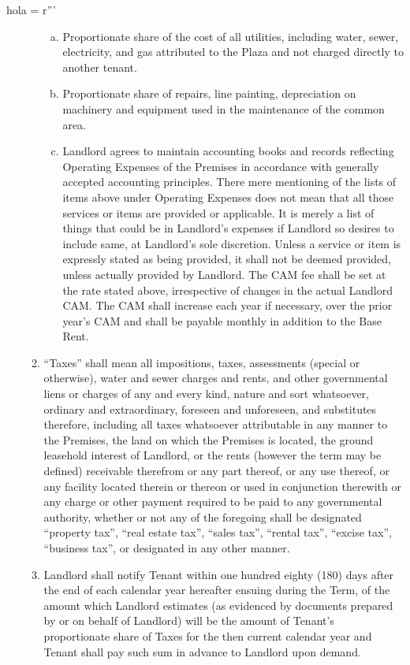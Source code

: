 hola = r'''\documentclass{article}
\begin{document}
\begin{enumerate}[(A)]
\begin{enumerate}[I]
\begin{enumerate}[(a)]
        \item Proportionate share of the cost of all utilities, including water, sewer, electricity, and gas attributed to the Plaza and not charged directly to another tenant.

        \item Proportionate share of repairs, line painting, depreciation on machinery and equipment used in the maintenance of the common area. 

         \item Landlord agrees to maintain accounting books and records reflecting Operating Expenses of the Premises in accordance with generally accepted accounting principles.  There mere mentioning of the lists of items above under Operating Expenses does not mean that all those services or items are provided or applicable.  It is merely a list of things that could be in Landlord’s expenses if Landlord so desires to include same, at Landlord’s sole discretion. Unless a service or item is expressly stated as being provided, it shall not be deemed provided, unless actually provided by Landlord.  The CAM fee shall be set at the rate stated above, irrespective of changes in the actual Landlord CAM.  The CAM shall increase each year if necessary, over the prior year’s CAM and shall be payable monthly in addition to the Base Rent.
        \end{enumerate}
        \item ``Taxes'' shall mean all impositions, taxes, assessments (special or otherwise), water and sewer charges and rents, and other governmental liens or charges of any and every kind, nature and sort whatsoever, ordinary and extraordinary, foreseen and unforeseen, and substitutes therefore, including all taxes whatsoever attributable in any manner to the Premises, the land on which the Premises is located, the ground leasehold interest of Landlord, or the rents (however the term may be defined) receivable therefrom or any part thereof, or any use thereof, or any facility located therein or thereon or used in conjunction therewith or any charge or other payment required to be paid to any governmental authority, whether or not any of the foregoing shall be designated ``property tax'', ``real estate tax'', ``sales tax'', ``rental tax'', ``excise tax'', ``business tax'', or designated in any other manner.

         \item Landlord shall notify Tenant within one hundred eighty (180) days after the end of each calendar year hereafter ensuing during the Term, of the amount which Landlord estimates (as evidenced by documents prepared by or on behalf of Landlord) will be the amount of Tenant's proportionate share of Taxes for the then current calendar year and Tenant shall pay such sum in advance to Landlord upon demand.


\end{enumerate}
\end{enumerate}
\end{document}

